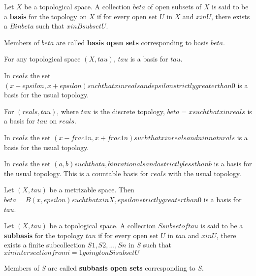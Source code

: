 \begin{defn}
    Let $X$ be a topological space. A collection $beta$ of open subsets of $X$ is said to be a \textbf{basis} for the topology on $X$ if for every open set $U$ in $X$ and $x in U$, there exists a $B in beta$ such that $x in B subset U$.

    Members of $beta$ are called \textbf{basis open sets} corresponding to basis $beta$.
\end{defn}

\begin{note}
    For any topological space $(X, tau)$, $tau$ is a basis for $tau$.
\end{note}

\begin{note}
    In $reals$ the set ${{ (x - epsilon, x + epsilon) such that x in reals and epsilon strictly greater than 0 }}$ is a basis for the usual topology.
\end{note}

\begin{note}
    For $(reals, tau)$, where $tau$ is the discrete topology, $beta = {{ {{ x }} such that x in reals }}$ is a basis for $tau$ on $reals$.
\end{note}

\begin{note}
    In $reals$ the set ${{ (x - frac{1}{n}, x + frac{1}{n}) such that x in reals and n in naturals }}$ is a basis for the usual topology.
\end{note}

\begin{note}
    In $reals$ the set ${{ (a, b) such that a,b in rationals and a strictly less than b }}$ is a basis for the usual topology. This is a countable basis for $reals$ with the usual topology.
\end{note}

\begin{note}
    Let $(X, tau)$ be a metrizable space. Then $beta = {{ B(x, epsilon) such that x in X, epsilon strictly greater than 0 }}$ is a basis for $tau$.
\end{note}

\begin{defn}
    Let $(X, tau)$ be a topological space. A collection $S subset of tau$ is said to be a \textbf{subbasis} for the topology $tau$ if for every open set $U$ in $tau$ and $x in U$, there exists a finite subcollection ${{ S1, S2, ..., Sn }}$ in $S$ such that $x in intersection from {i = 1} going to n Si subset U$

    Members of $S$ are called \textbf{subbasis open sets} corresponding to $S$.
\end{defn}

